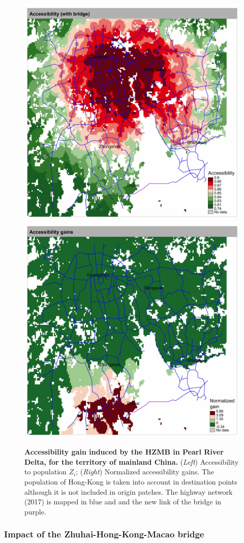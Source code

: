 \documentclass[11pt]{article}
\begin{document}
\begin{figure}
	\includegraphics[width=0.49\linewidth]{accessp_withbridge_prd_EN.jpg}
	\includegraphics[width=0.49\linewidth]{accesspdiff_prd_EN.jpg}
	\caption{\textbf{Accessibility gain induced by the HZMB in Pearl River Delta, for the territory of mainland China.} (\textit{Left}) Accessibility to population $Z_i$; (\textit{Right}) Normalized accessibility gains. The population of Hong-Kong is taken into account in destination points although it is not included in origin patches. The highway network (2017) is mapped in blue and and the new link of the bridge in purple.\label{fig:casestudies:prd}}
\end{figure}

\subsubsection{Impact of the Zhuhai-Hong-Kong-Macao bridge}
\end{document}
